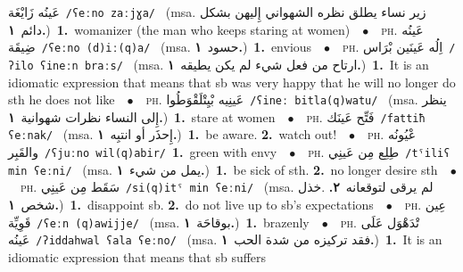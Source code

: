 \documentclass[10pt,a4paper,twoside]{article} %
\begin{document}
\begin{multicols}{2}
\foreignlanguage{arabic}{عَينُه زَايْغَة}\color{black}\ {\color{gray}\texttt{/{\sffamily ʕeːno zaːjɣa}/}\color{black}}\ \color{gray} (msa. \foreignlanguage{arabic}{زير نساء يطلق نظره الشهواني إِليهن بشكل دائم}~\foreignlanguage{arabic}{\textbf{١.}})\color{black}\ \textbf{1.}~womanizer (the man who keeps staring at women)\ \ $\bullet$\ \ \textsc{ph.} \color{gray} \foreignlanguage{arabic}{عَينُه ضِيقَة}\color{black}\ {\color{gray}\texttt{/{\sffamily ʕeːno (d)iː(q)a}/}\color{black}}\ \color{gray} (msa. \foreignlanguage{arabic}{حسود}~\foreignlanguage{arabic}{\textbf{١.}})\color{black}\ \textbf{1.}~envious\ \ $\bullet$\ \ \textsc{ph.} \color{gray} \foreignlanguage{arabic}{اِلُه عَينَين بْرَاس}\color{black}\ {\color{gray}\texttt{/{\sffamily ʔilo ʕineːn braːs}/}\color{black}}\ \color{gray} (msa. \foreignlanguage{arabic}{ارتاح من فعل شيء لم يكن يطيقه}~\foreignlanguage{arabic}{\textbf{١.}})\color{black}\ \textbf{1.}~It is an idiomatic expression that means that sb was very happy that he will no longer do sth he does not like\ \ $\bullet$\ \ \textsc{ph.} \color{gray} \foreignlanguage{arabic}{عَينِيه بْيِتْلَقْوَطُوا}\color{black}\ {\color{gray}\texttt{/{\sffamily ʕineː bitla(q)watu}/}\color{black}}\ \color{gray} (msa. \foreignlanguage{arabic}{ينظر إِلى النساء نظرات شهوانية}~\foreignlanguage{arabic}{\textbf{١.}})\color{black}\ \textbf{1.}~stare at women\ \ $\bullet$\ \ \textsc{ph.} \color{gray} \foreignlanguage{arabic}{فَتِّح عَينَك}\color{black}\ {\color{gray}\texttt{/{\sffamily fattiħ ʕeːnak}/}\color{black}}\ \color{gray} (msa. \foreignlanguage{arabic}{إِحذَر أو انتبِه}~\foreignlanguage{arabic}{\textbf{١.}})\color{black}\ \textbf{1.}~be aware.  \textbf{2.}~watch out!\ \ $\bullet$\ \ \textsc{ph.} \color{gray} \foreignlanguage{arabic}{عْيُونُه والقَبِر}\color{black}\ {\color{gray}\texttt{/{\sffamily ʕjuːno wil(q)abir}/}\color{black}}\ \textbf{1.}~green with envy\ \ $\bullet$\ \ \textsc{ph.} \color{gray} \foreignlanguage{arabic}{طِلِع مِن عَينِي}\color{black}\ {\color{gray}\texttt{/{\sffamily tˤiliʕ min ʕeːni}/}\color{black}}\ \color{gray} (msa. \foreignlanguage{arabic}{يمل من شيء}~\foreignlanguage{arabic}{\textbf{١.}})\color{black}\ \textbf{1.}~be sick of sth.  \textbf{2.}~no longer desire sth\ \ $\bullet$\ \ \textsc{ph.} \color{gray} \foreignlanguage{arabic}{سَقَط مِن عَينِي}\color{black}\ {\color{gray}\texttt{/{\sffamily si(q)itˤ min ʕeːni}/}\color{black}}\ \color{gray} (msa. \foreignlanguage{arabic}{لم يرقى لتوقعانه}~\foreignlanguage{arabic}{\textbf{٢.}}  .\foreignlanguage{arabic}{خذل شخص}~\foreignlanguage{arabic}{\textbf{١.}})\color{black}\ \textbf{1.}~disappoint sb.  \textbf{2.}~do not live up to sb's expectations\ \ $\bullet$\ \ \textsc{ph.} \color{gray} \foreignlanguage{arabic}{عِين قَوِيِّة}\color{black}\ {\color{gray}\texttt{/{\sffamily ʕeːn (q)awijje}/}\color{black}}\ \color{gray} (msa. \foreignlanguage{arabic}{بوقاحَة}~\foreignlanguage{arabic}{\textbf{١.}})\color{black}\ \textbf{1.}~brazenly\ \ $\bullet$\ \ \textsc{ph.} \color{gray} \foreignlanguage{arabic}{تْدَهْوَل عَلَى عَينُه}\color{black}\ {\color{gray}\texttt{/{\sffamily ʔiddahwal ʕala ʕeːno}/}\color{black}}\ \color{gray} (msa. \foreignlanguage{arabic}{فقد تركيزه من شدة الحب}~\foreignlanguage{arabic}{\textbf{١.}})\color{black}\ \textbf{1.}~It is an idiomatic expression that means that sb suffers 
\end{multicols}
\end{document}
